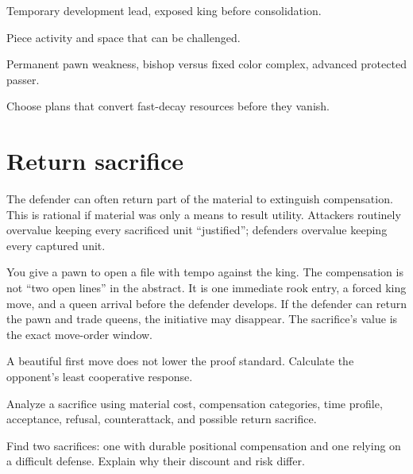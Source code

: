 \begin{description}[style=nextline,leftmargin=2.4em,labelsep=.5em]
\item[Fast-decay.] Temporary development lead, exposed king before consolidation.
\item[Medium-decay.] Piece activity and space that can be challenged.
\item[Slow-decay.] Permanent pawn weakness, bishop versus fixed color complex, advanced protected passer.
\end{description}

Choose plans that convert fast-decay resources before they vanish.

\section{Return sacrifice}
The defender can often return part of the material to extinguish compensation. This is rational if material was only a means to result utility. Attackers routinely overvalue keeping every sacrificed unit ``justified''; defenders overvalue keeping every captured unit.

\begin{workedbox}[title={Worked example: sacrifice to buy a move}]
You give a pawn to open a file with tempo against the king. The compensation is not ``two open lines'' in the abstract. It is one immediate rook entry, a forced king move, and a queen arrival before the defender develops. If the defender can return the pawn and trade queens, the initiative may disappear. The sacrifice's value is the exact move-order window.
\end{workedbox}

\begin{warningbox}
A beautiful first move does not lower the proof standard. Calculate the opponent's least cooperative response.
\end{warningbox}

\begin{exercise}
Analyze a sacrifice using material cost, compensation categories, time profile, acceptance, refusal, counterattack, and possible return sacrifice.
\end{exercise}

\begin{exercise}
Find two sacrifices: one with durable positional compensation and one relying on a difficult defense. Explain why their discount and risk differ.
\end{exercise}

